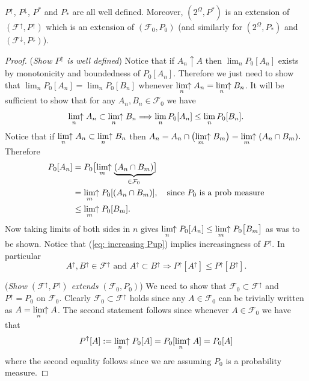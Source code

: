 \begin{theorem}
\label{thm: well defined Pup, P*}
 $P^\uparrow$, $P^\downarrow$, $P^*$ and $P_*$ are all well defined. Moreover,  $(2^\Omega, P^*)$ is an extension of $(\mathcal F^\uparrow, P^\uparrow)$ which is an extension of $(\mathcal F_0, P_0)$ (and similarly for $(2^\Omega, P_*)$ and $(\mathcal F^\downarrow, P^\downarrow)$).
 \end{theorem}
\begin{proof}
({\sl Show $P^\uparrow$ is well defined})
Notice that if $A_n \uparrow A$ then  $\lim_n P_0[A_n]$ exists by monotonicity and boundedness of $P_0[A_n]$. Therefore we just need to show that  $\lim_n P_0[A_n] = \lim_n P_0[B_n]$ whenever $\displaystyle\lim_{n}\!\!\uparrow A_n =  \displaystyle\lim_{n}\!\!\uparrow B_n$.
It will be sufficient to show that for any $A_n, B_n\in \mathcal F_0$ we have
\begin{equation}
\label{eq: increasing Pup}
\displaystyle\lim_{n}\!\!\uparrow A_n \subset   \displaystyle\lim_{n}\!\!\uparrow B_n \Longrightarrow \lim_n P_0[A_n] \leq \lim_n P_0[B_n].
\end{equation}
Notice that if $\displaystyle\lim_{n}\!\!\uparrow A_n \subset   \displaystyle\lim_{n}\!\!\uparrow B_n$ then
$A_n = A_n \cap \bigl(\displaystyle\lim_{m}\!\!\uparrow B_m\bigr) =  \displaystyle\lim_{m}\!\!\uparrow (A_n\cap B_m).
$
Therefore
\begin{align*}
P_0[A_n]  & = P_0\bigl[\displaystyle\lim_{m}\!\!\uparrow \underbrace{(A_n\cap B_m)}_{\in \mathcal F_0}\bigr] \\
& = \displaystyle\lim_{m}\!\!\uparrow P_0 [(A_n\cap B_m)],\quad\text{since $P_0$ is a prob measure} \\
& \leq  \displaystyle\lim_{m}\!\!\uparrow P_0[B_m].
\end{align*}
Now taking limits of both sides in $n$ gives $\displaystyle\lim_{n}\!\!\uparrow P_0[A_n]\leq  \displaystyle\lim_{m}\!\!\uparrow P_0\bigl[B_m\bigr]$ as was to be shown. Notice that (\ref{eq: increasing Pup}) implies  increasingness of $P^\uparrow$. In particular
\begin{equation}
\label{eq: increasing Pup II}
\text{$A^\uparrow, B^\uparrow \in \mathcal F^\uparrow$ and  $A^\uparrow\subset B^\uparrow$}
 \Longrightarrow P^\uparrow[A^\uparrow]\leq P^\uparrow[B^\uparrow].
\end{equation}


({\sl Show $(\mathcal F^\uparrow, P^\uparrow)$ extends $(\mathcal F_0, P_0)$})
We need to show that $\mathcal F_0\subset \mathcal F^\uparrow$ and $P^\uparrow = P_0$ on $\mathcal F_0$.
Clearly $\mathcal F_0\subset \mathcal F^\uparrow$ holds since  any $A\in \mathcal F_0$ can be trivially written as $A = \displaystyle\lim_{n}\!\!\uparrow A$. The second statement follows since whenever $A\in \mathcal F_0$ we have that
\begin{equation}
P^\uparrow[A] := \displaystyle\lim_{n}\!\!\uparrow P_0[A] = P_0[\displaystyle\lim_{n}\!\!\uparrow A] =   P_0[A]
\end{equation}
where the second equality follows since we are assuming $P_0$ is a probability measure.




\end{proof}
